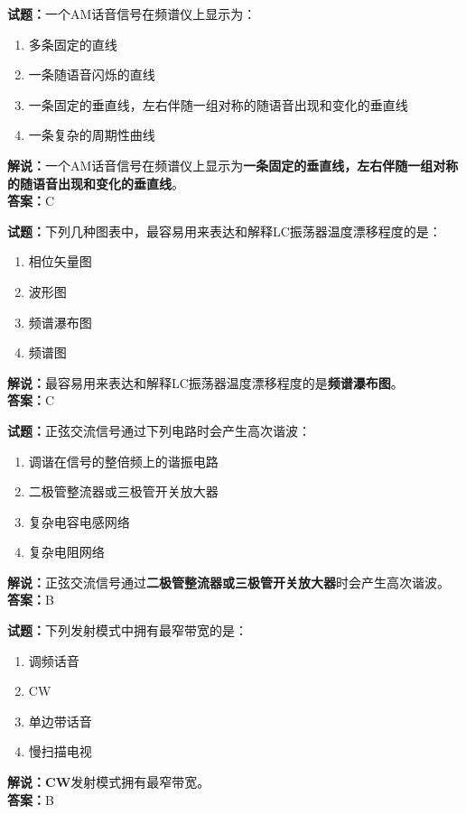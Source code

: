 \documentclass{ctexbook}
\begin{document}
\vspace{1em}

\textbf{试题：}一个AM话音信号在频谱仪上显示为：
\begin{enumerate}[leftmargin=3em]
  \item 多条固定的直线
  \item 一条随语音闪烁的直线
  \item 一条固定的垂直线，左右伴随一组对称的随语音出现和变化的垂直线
  \item 一条复杂的周期性曲线
\end{enumerate}
\noindent\textbf{解说：}一个AM话音信号在频谱仪上显示为\textbf{一条固定的垂直线，左右伴随一组对称的随语音出现和变化的垂直线}。\\\noindent\textbf{答案：}C

\vspace{1em}

\textbf{试题：}下列几种图表中，最容易用来表达和解释LC振荡器温度漂移程度的是：
\begin{enumerate}[leftmargin=3em]
  \item 相位矢量图
  \item 波形图
  \item 频谱瀑布图
  \item 频谱图
\end{enumerate}
\noindent\textbf{解说：}最容易用来表达和解释LC振荡器温度漂移程度的是\textbf{频谱瀑布图}。\\\noindent\textbf{答案：}C

\vspace{1em}

\textbf{试题：}正弦交流信号通过下列电路时会产生高次谐波：
\begin{enumerate}[leftmargin=3em]
  \item 调谐在信号的整倍频上的谐振电路
  \item 二极管整流器或三极管开关放大器
  \item 复杂电容电感网络
  \item 复杂电阻网络
\end{enumerate}
\noindent\textbf{解说：}正弦交流信号通过\textbf{二极管整流器或三极管开关放大器}时会产生高次谐波。\\\noindent\textbf{答案：}B

\vspace{1em}

\textbf{试题：}下列发射模式中拥有最窄带宽的是：
\begin{enumerate}[leftmargin=3em]
  \item 调频话音
  \item CW
  \item 单边带话音
  \item 慢扫描电视
\end{enumerate}
\noindent\textbf{解说：}\textbf{CW}发射模式拥有最窄带宽。\\\noindent\textbf{答案：}B
\end{document}
